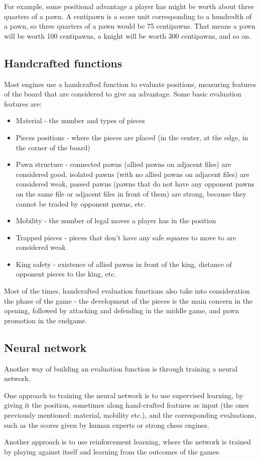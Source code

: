 For example, some positional advantage a player has might be worth about three quarters of a pawn. A centipawn is a score unit corresponding to a hundredth of a pawn, so three quarters of a pawn would be 75 centipawns. That means a pawn will be worth 100 centipawns, a knight will be worth 300 centipawns, and so on.

\subsection{Handcrafted functions}
\label{subsec:ch2sec3subsec2}

Most engines use a handcrafted function to evaluate positions, measuring features of the board that are considered to give an advantage. Some basic evaluation features are:
\begin{itemize}
    \item Material - the number and types of pieces
    \item Pieces positions - where the pieces are placed (in the center, at the edge, in the corner of the board)
    \item Pawn structure - connected pawns (allied pawns on adjacent files) are considered good, isolated pawns (with no allied pawns on adjacent files) are considered weak, passed pawns (pawns that do not have any opponent pawns on the same file or adjacent files in front of them) are strong, because they cannot be traded by opponent pawns, etc.
    \item Mobility - the number of legal moves a player has in the position
    \item Trapped pieces - pieces that don't have any safe squares to move to are considered weak
    \item King safety - existence of allied pawns in front of the king, distance of opponent pieces to the king, etc.
\end{itemize}

Most of the times, handcrafted evaluation functions also take into consideration the phase of the game - the development of the pieces is the main concern in the opening, followed by attacking and defending in the middle game, and pawn promotion in the endgame.

\subsection{Neural network}
\label{subsec:ch2sec3subsec3}

Another way of building an evaluation function is through training a neural network.

One approach to training the neural network is to use supervised learning, by giving it the position, sometimes along hand-crafted features as input (the ones previously mentioned: material, mobility etc.), and the corresponding evaluations, such as the scores given by human experts or strong chess engines.

Another approach is to use reinforcement learning, where the network is trained by playing against itself and learning from the outcomes of the games.
